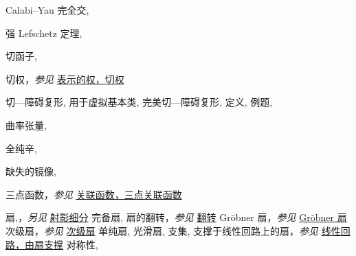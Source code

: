 \begin{theindex}
\subsubitem \leavevmode\hypertarget{idx:0326}{Calabi--Yau 完全交},\enspace{}
\indexspace
\item \leavevmode\hypertarget{idx:0577}{强 Lefschetz 定理},\enspace{}
\indexspace
\item \leavevmode\hypertarget{idx:1326}{切函子},\enspace{}
\indexspace
\item \leavevmode\hypertarget{idx:1327}{切权}，\textit{参见} \hyperlink{idx:1437}{表示的权，切权}
\indexspace
\item \leavevmode\hypertarget{idx:1328}{切—障碍复形},\enspace{}
\subitem \leavevmode\hypertarget{idx:1329}{用于虚拟基本类},\enspace{}
\subitem \leavevmode\hypertarget{idx:1330}{完美切—障碍复形},\enspace{}
\subsubitem \leavevmode\hypertarget{idx:1331}{定义},\enspace{}
\subsubitem \leavevmode\hypertarget{idx:1332}{例题},\enspace{}
\indexspace
\item \leavevmode\hypertarget{idx:0206}{曲率张量},\enspace{}
\indexspace
\item \leavevmode\hypertarget{idx:0612}{全纯辛},\enspace{}
\indexspace
\item \leavevmode\hypertarget{idx:0869}{缺失的镜像},\enspace{}
\indexspace
\item \leavevmode\hypertarget{idx:1333}{三点函数}，\textit{参见} \hyperlink{idx:0195}{关联函数，三点关联函数}
\indexspace
\item \leavevmode\hypertarget{idx:0297}{扇},\enspace{}，\textit{另见} \hyperlink{idx:1094}{射影细分}
\subitem \leavevmode\hypertarget{idx:0298}{完备扇},\enspace{}
\subitem \leavevmode\hypertarget{idx:0299}{扇的翻转}，\textit{参见} \hyperlink{idx:0328}{翻转}
\subitem \leavevmode\hypertarget{idx:0300}{Gröbner 扇}，\textit{参见} \hyperlink{idx:0453}{Gr\"obner 扇}
\subitem \leavevmode\hypertarget{idx:0301}{次级扇}，\textit{参见} \hyperlink{idx:1239}{次级扇}
\subitem \leavevmode\hypertarget{idx:0302}{单纯扇},\enspace{}
\subitem \leavevmode\hypertarget{idx:0303}{光滑扇},\enspace{}
\subitem \leavevmode\hypertarget{idx:0304}{支集},\enspace{}
\subitem \leavevmode\hypertarget{idx:0305}{支撑于线性回路上的扇}，\textit{参见} \hyperlink{idx:0720}{线性回路，由扇支撑}
\subitem \leavevmode\hypertarget{idx:0306}{对称性},\enspace{}

\end{theindex}
